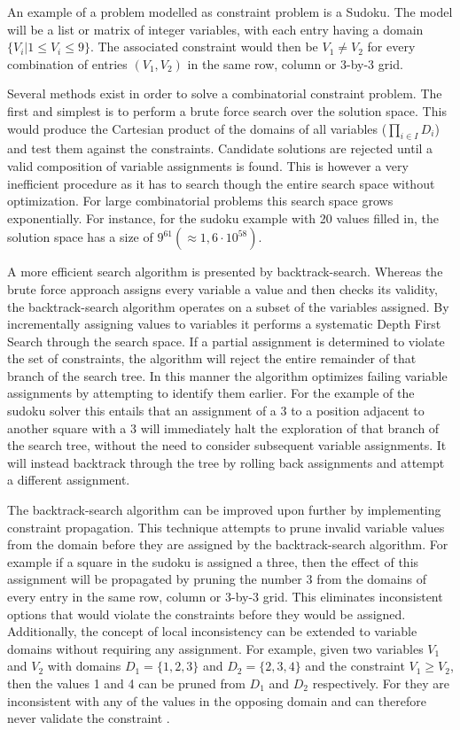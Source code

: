 An example of a problem modelled as constraint problem is a Sudoku. The model will be a list or matrix of integer variables, with each entry having a domain $\{V_i|1\leq V_i\leq 9\}$. The associated constraint would then be $V_1 \neq V_2$ for every combination of entries $(V_1,V_2)$ in the same row, column or 3-by-3 grid.

Several methods exist in order to solve a combinatorial constraint problem. The first and simplest is to perform a brute force search over the solution space. This would produce the Cartesian product of the domains of all variables ($\prod_{i\in I} D_i$) and test them against the constraints. Candidate solutions are rejected until a valid composition of variable assignments is found. This is however a very inefficient procedure as it has to search though the entire search space without optimization. For large combinatorial problems this search space grows exponentially. For instance, for the sudoku example with 20 values filled in, the solution space has a size of $9^{61}(\approx 1,6\cdot 10^{58})$.

A more efficient search algorithm is presented by backtrack-search. Whereas the brute force approach assigns every variable a value and then checks its validity, the backtrack-search algorithm operates on a subset of the variables assigned. By incrementally assigning values to variables it performs a systematic Depth First Search through the search space. If a partial assignment is determined to violate the set of constraints, the algorithm will reject the entire remainder of that branch of the search tree. In this manner the algorithm optimizes failing variable assignments by attempting to identify them earlier. For the example of the sudoku solver this entails that an assignment of a 3 to a position adjacent to another square with a 3 will immediately halt the exploration of that branch of the search tree, without the need to consider subsequent variable assignments. It will instead backtrack through the tree by rolling back assignments and attempt a different assignment.

The backtrack-search algorithm can be improved upon further by implementing constraint propagation. This technique attempts to prune invalid variable values from the domain before they are assigned by the backtrack-search algorithm. For example if a square in the sudoku is assigned a three, then the effect of this assignment will be propagated by pruning the number 3 from the domains of every entry in the same row, column or 3-by-3 grid. This eliminates inconsistent options that would violate the constraints before they would be assigned. Additionally, the concept of local inconsistency can be extended to variable domains without requiring any assignment. For example, given two variables $V_1$ and $V_2$ with domains $D_1=\{1,2,3\}$ and $D_2=\{2,3,4\}$ and the constraint $V_1 \geq V_2$, then the values 1 and 4 can be pruned from $D_1$ and $D_2$ respectively. For they are inconsistent with any of the values in the opposing domain and can therefore never validate the constraint \cite{constraint_general, constraint_algorithm}.


